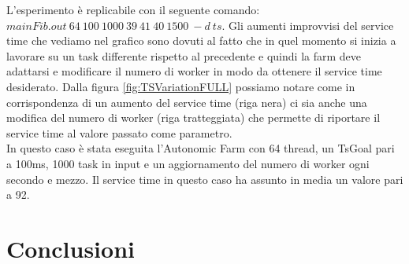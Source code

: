 \documentclass[12pt]{report}
\begin{document}
\begin{figure}[H]
\centering
  \caption{}
\end{figure}


L'esperimento è replicabile con il seguente comando:
$mainFib.out\ 64\ 100\ 1000\ 39\ 41\ 40\ 1500\ -d\ ts$.
Gli aumenti improvvisi del service time che vediamo nel grafico sono dovuti al fatto che in quel momento si inizia a lavorare su un task differente rispetto al precedente e quindi la farm deve adattarsi e modificare il numero di worker in modo da ottenere il service time desiderato.
Dalla figura \ref{fig:TSVariationFULL} possiamo notare come in corrispondenza di un aumento del service time (riga nera) ci sia anche una modifica del numero di worker (riga tratteggiata) che permette di riportare il service time al valore passato come parametro.\\In questo caso è stata eseguita l'Autonomic Farm con 64 thread, un TsGoal pari a 100ms, 1000 task in input e un aggiornamento del numero di worker ogni secondo e mezzo.
Il service time in questo caso ha assunto in media un valore pari a 92.

\chapter{Conclusioni}
\end{document}
